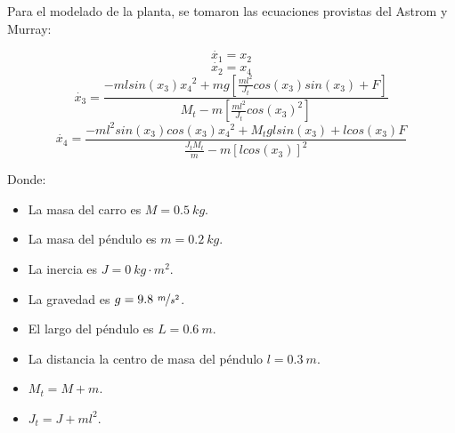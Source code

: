 %
%
%

Para el modelado de la planta, se tomaron las ecuaciones provistas del Astrom y Murray:


\begin{equation*}
	\dot{x_1} = x_2
\end{equation*}
\begin{equation*}
	\dot{x_2} = x_4
\end{equation*}
\begin{equation*}
	\dot{x_3} = \frac{-m l sin(x_3) {x_4}^2 + mg \left[ \frac{m l^2}{J_t} cos(x_3) sin(x_3) + F \right] }{M_t - m \left[ \frac{m l^2}{J_t} {cos(x_3)}^2 \right]}
\end{equation*}
\begin{equation*}
	\dot{x_4} = \frac{-m l^2 sin(x_3) cos(x_3) {x_4}^2 + M_t g l sin(x_3) + l cos(x_3) F}{\frac{J_t M_t}{m} - m \left[l cos(x_3)\right]^2}
\end{equation*}

Donde:
\begin{multicols}{2}
\begin{itemize}
	\item La masa del carro es $M = 0.5 \ kg$.
	\item La masa del péndulo es $m = 0.2 \ kg$.
	\item La inercia es $J = 0 \ kg \cdot m^2$.
	\item La gravedad es $g = 9.8 \ \nicefrac{m}{s^2}$.
	\item El largo del péndulo es $L = 0.6 \ m$.
	\item La distancia la centro de masa del péndulo $l = 0.3 \ m$.
	\item $M_t = M + m$.
	\item $J_t = J + m l^2$.
\end{itemize}
\end{multicols}

